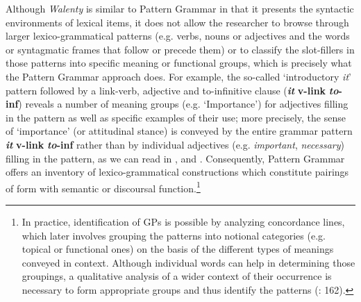 \documentclass[output=paper]{langscibook}
\begin{document}
\largerpage[-2]%
Although \textit{Walenty} is similar to Pattern Grammar in that it presents the syntactic environments of lexical items, it does not allow the researcher to browse through larger lexico-grammatical patterns (e.g. verbs, nouns or adjectives and the words or syntagmatic frames that follow or precede them) or to classify the slot-fillers in those patterns into specific meaning or functional groups, which is precisely what the Pattern Grammar approach does. For example, the so-called ‘introductory \textit{it}’ pattern followed by a link-verb, adjective and to-infinitive clause (\textbf{\textit{it}} \textbf{v-link} \textbf{{\ADJ}} \textbf{\textit{to}}\textbf{{}-inf}) reveals a number of meaning groups (e.g. `Importance') for adjectives filling in the pattern as well as specific examples of their use; more precisely, the sense of `importance' (or attitudinal stance) is conveyed by the entire grammar pattern \textbf{\textit{it}} \textbf{v-link} \textbf{{\ADJ}} \textbf{\textit{to}}\textbf{{}-inf} rather than by individual adjectives (e.g. \textit{important}, \textit{necessary}) filling in the pattern, as we can read in \citet[494-498]{FrancisEtAl1998}, \citet[29]{HunstonFrancis2000} and \citet[260-262]{Groom2005}. Consequently, Pattern Grammar offers an inventory of lexico-grammatical constructions which constitute pairings of form with semantic or discoursal function.\footnote{In practice, identification of GPs is possible by analyzing concordance lines, which later involves grouping the patterns into notional categories (e.g. topical or functional ones) on the basis of the different types of meanings conveyed in context. Although individual words can help in determining those groupings, a qualitative analysis of a wider context of their occurrence is necessary to form appropriate groups and thus identify the patterns (\citealt{HunstonFrancis2000}: 162).}
\end{document}
